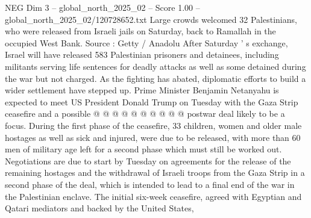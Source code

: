 \begin{textsample}{NEG Dim 3 – global\_north\_2025\_02 – Score 1.00 – global\_north\_2025\_02/120728652.txt}
Large crowds welcomed 32 Palestinians, who were released from Israeli jails on Saturday, back to Ramallah in the occupied West Bank.
Source : Getty / Anadolu After Saturday ' s exchange, Israel will have released 583 Palestinian prisoners and detainees, including militants serving life sentences for deadly attacks as well as some detained during the war but not charged.
As the fighting has abated, diplomatic efforts to build a wider settlement have stepped up.
Prime Minister Benjamin Netanyahu is expected to meet US President Donald Trump on Tuesday with the Gaza Strip ceasefire and a possible @ @ @ @ @ @ @ @ @ @ postwar deal likely to be a focus.
During the first phase of the ceasefire, 33 children, women and older male hostages as well as sick and injured, were due to be released, with more than 60 men of military age left for a second phase which must still be worked out.
Negotiations are due to start by Tuesday on agreements for the release of the remaining hostages and the withdrawal of Israeli troops from the Gaza Strip in a second phase of the deal, which is intended to lead to a final end of the war in the Palestinian enclave.
The initial six-week ceasefire, agreed with Egyptian and Qatari mediators and backed by the United States,

\end{textsample}
